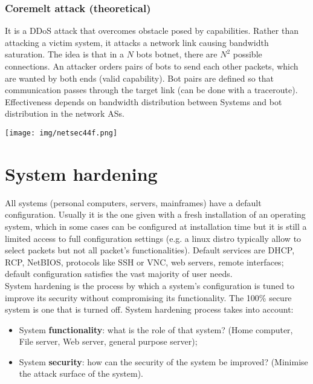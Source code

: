 \documentclass[a4paper, 10pt, titlepage]{article}
\begin{document}
\subsubsection*{Coremelt attack (theoretical)}
It is a DDoS attack that overcomes obstacle posed by capabilities. Rather than attacking a victim system, it attacks a network link causing bandwidth saturation. The idea is that in a $N$ bots botnet, there are $N^2$ possible connections. An attacker orders pairs of bots to send each other packets, which are wanted by both ends (valid capability). Bot pairs are defined so that communication passes through the target link (can be done with a traceroute).
Effectiveness depends on bandwidth distribution between Systems and bot distribution in the network ASs.
\begin{center}
	\texttt{[image: img/netsec44f.png]}
\end{center}

\newpage
\section{System hardening}
All systems (personal computers, servers, mainframes) have a default configuration. Usually it is the one given with a fresh installation of an operating system, which in some cases can be configured at installation time but it is still a limited access to full configuration settings (e.g. a linux distro typically allow to select packets but not all packet's functionalities). Default services are DHCP, RCP, NetBIOS, protocols like SSH or VNC, web servers, remote interfaces; default configuration satisfies the vast majority of user
needs. \\
System hardening is the process by which a system’s configuration is tuned to improve its security without compromising its functionality. The 100\% secure system is one that is turned off. System hardening process takes into account:
\begin{itemize}
	\item System \textbf{functionality}: what is the role of that system? (Home computer, File server, Web server, general purpose server);
	\item System \textbf{security}: how can the security of the system be
	improved? (Minimise the attack surface of the system).
\end{itemize}
\end{document}
